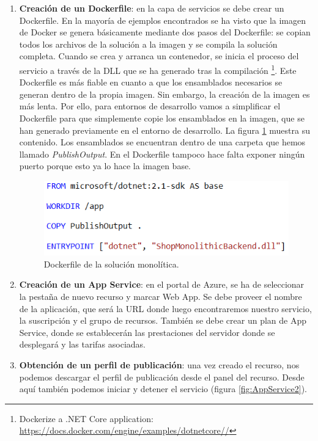 \documentclass[11pt,spanish,listoffigures]{tfgetsinf}
\begin{document}
\begin{enumerate}

\item \textbf{Creación de un Dockerfile}: en la capa de servicios se debe crear un Dockerfile. En la mayoría de ejemplos encontrados se ha visto que la imagen de Docker se genera básicamente mediante dos pasos del Dockerfile: se copian todos los archivos de la solución a la imagen y se compila la solución completa. Cuando se crea y arranca un contenedor, se inicia el proceso del servicio a través de la DLL que se ha generado tras la compilación \footnote{ Dockerize a .NET Core application: \url{https://docs.docker.com/engine/examples/dotnetcore//}}. Este Dockerfile es más fiable en cuanto a que los ensamblados necesarios se generan dentro de la propia imagen. Sin embargo, la creación de la imagen es más lenta. Por ello, para entornos de desarrollo vamos a simplificar el Dockerfile para que simplemente copie los ensamblados en la imagen, que se han generado previamente en el entorno de desarrollo. La figura \ref{fig:Dockerfile} muestra su contenido. Los ensamblados se encuentran dentro de una carpeta que hemos llamado \textit{PublishOutput}. En el Dockerfile tampoco hace falta exponer ningún puerto porque esto ya lo hace la imagen base.

\begin{figure}[h]
\centering
\includegraphics[scale=0.8]{Dockerfile}
\caption{Dockerfile de la solución monolítica.}
\label{fig:Dockerfile}
\end{figure}

\item \textbf{Creación de un App Service}: en el portal de Azure, se ha de seleccionar la pestaña de nuevo recurso y marcar Web App. Se debe proveer el nombre de la aplicación, que será la URL donde luego encontraremos nuestro servicio, la suscripción y el grupo de recursos. También se debe crear un plan de App Service, donde se establecerán las prestaciones del servidor donde se desplegará y las tarifas asociadas. 

\item \textbf{Obtención de un perfil de publicación}: una vez creado el recurso, nos podemos descargar el perfil de publicación desde el panel del recurso. Desde aquí también  podemos iniciar y detener el servicio (figura \ref{fig:AppService2}).


\end{enumerate}
\end{document}
